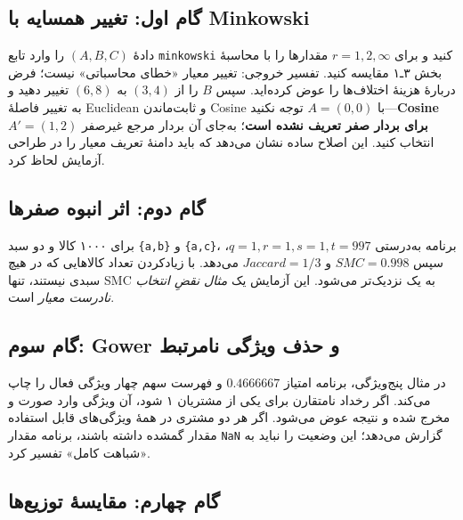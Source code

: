 \documentclass[12pt,a4paper,oneside]{book}
\begin{document}
\subsection{گام اول: تغییر همسایه با Minkowski}\label{ux6afux627ux645-ux627ux648ux644-ux62aux63aux6ccux6ccux631-ux647ux645ux633ux627ux6ccux647-ux628ux627-minkowski}

دادهٔ \((A,B,C)\) را وارد تابع \texttt{minkowski} کنید و برای \(r=1,2,\infty\) مقدارها را با محاسبهٔ بخش ۳ـ۱ مقایسه کنید. تفسیر خروجی: تغییر معیار «خطای محاسباتی» نیست؛ فرض دربارهٔ هزینهٔ اختلاف‌ها را عوض کرده‌اید. سپس \(B\) را از \((3,4)\) به \((6,8)\) تغییر دهید و به تغییر فاصلهٔ Euclidean و ثابت‌ماندن Cosine با \(A=(0,0)\) توجه نکنید---\textbf{Cosine برای بردار صفر تعریف نشده است}؛ به‌جای آن بردار مرجع غیرصفر \(A'=(1,2)\) انتخاب کنید. این اصلاح ساده نشان می‌دهد که باید دامنهٔ تعریف معیار را در طراحی آزمایش لحاظ کرد.

\subsection{گام دوم: اثر انبوه صفرها}\label{ux6afux627ux645-ux62fux648ux645-ux627ux62bux631-ux627ux646ux628ux648ux647-ux635ux641ux631ux647ux627}

برای ۱۰۰۰ کالا و دو سبد \texttt{\{a,b\}} و \texttt{\{a,c\}}، برنامه به‌درستی \(q=1,r=1,s=1,t=997\)، سپس \(SMC=0.998\) و \(Jaccard=1/3\) می‌دهد. با زیادکردن تعداد کالاهایی که در هیچ سبدی نیستند، تنها SMC به یک نزدیک‌تر می‌شود. این آزمایش یک \emph{مثال نقضِ انتخاب نادرست معیار} است.

\subsection{گام سوم: Gower و حذف ویژگی نامرتبط}\label{ux6afux627ux645-ux633ux648ux645-gower-ux648-ux62dux630ux641-ux648ux6ccux698ux6afux6cc-ux646ux627ux645ux631ux62aux628ux637}

در مثال پنج‌ویژگی، برنامه امتیاز \(0.4666667\) و فهرست سهم چهار ویژگی فعال را چاپ می‌کند. اگر رخداد نامتقارن برای یکی از مشتریان ۱ شود، آن ویژگی وارد صورت و مخرج شده و نتیجه عوض می‌شود. اگر هر دو مشتری در همهٔ ویژگی‌های قابل استفاده مقدار گمشده داشته باشند، برنامه مقدار \texttt{NaN} گزارش می‌دهد؛ این وضعیت را نباید به «شباهت کامل» تفسیر کرد.

\subsection{گام چهارم: مقایسهٔ توزیع‌ها}\label{ux6afux627ux645-ux686ux647ux627ux631ux645-ux645ux642ux627ux6ccux633ux647-ux62aux648ux632ux6ccux639ux647ux627}
\end{document}
